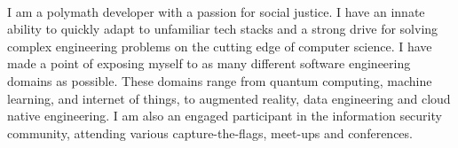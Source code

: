 
 \

\begin{cvparagraph}

I am a polymath developer with a passion for social justice. I have an innate ability to quickly adapt to unfamiliar tech stacks and a strong drive for solving complex engineering problems on the cutting edge of computer science. I have made a point of exposing myself to as many different software engineering domains as possible. These domains range from quantum computing, machine learning, and internet of things, to augmented reality, data engineering and cloud native engineering. I am also an engaged participant in the information security community, attending various capture-the-flags, meet-ups and conferences.

\end{cvparagraph}
